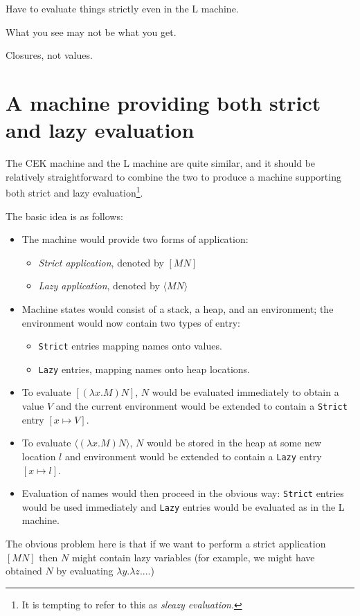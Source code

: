 \documentclass[a4paper]{article}
\begin{document}
Have to evaluate things strictly even in the L machine.

What you see may not be what you get.

Closures, not values.

\section{A machine providing both strict and lazy evaluation}\label{sec:strict-lazy}
The CEK machine and the L machine are quite similar, and it should be
relatively straightforward to combine the two to produce a machine
supporting both strict and lazy evaluation\footnote{It is tempting to
  refer to this as \textit{sleazy evaluation}.}.

The basic idea is as follows:
\begin{itemize}
\item The machine would provide two forms of application:
  \begin{itemize}
  \item \textit{Strict application}, denoted by $[M N]$
  \item \textit{Lazy application}, denoted by $\langle M N \rangle$
  \end{itemize}
  \item Machine states would consist of a stack, a heap, and an environment;
    the environment would now contain two types of entry:
  \begin{itemize}
  \item \texttt{Strict} entries mapping names onto values.
  \item \texttt{Lazy} entries, mapping names onto heap locations.
  \end{itemize}
  \item To evaluate $[(\lambda x.M) N]$, $N$ would be evaluated immediately
    to obtain a value $V$ and the current environment would be extended to
    contain a \texttt{Strict} entry $[x \mapsto V]$.
  \item To evaluate $\langle (\lambda x.M) N \rangle$, $N$ would be
    stored in the heap at some new location $l$ and
    environment would be extended to contain a \texttt{Lazy} entry
    $[x \mapsto l]$.
  \item Evaluation of names would then proceed in the obvious way:
    \texttt{Strict} entries would be used immediately and \texttt{Lazy}
    entries would be evaluated as in the L machine.
\end{itemize}


The obvious problem here is that if we want to perform
a strict application $[M N]$ then $N$ might contain lazy variables
(for example, we might have obtained $N$ by evaluating $\lambda y. \lambda z. ...$)
\end{document}
